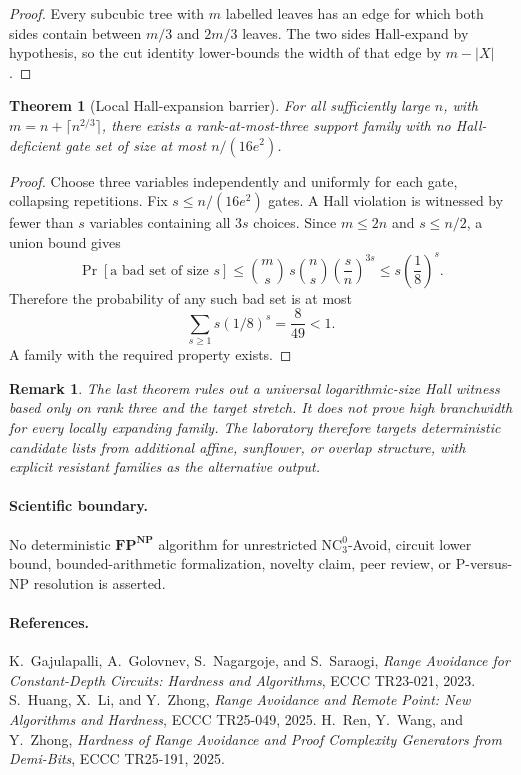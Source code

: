 \documentclass[11pt]{article}
\newtheorem{theorem}{Theorem}
\newtheorem{remark}{Remark}
\begin{document}
\begin{proof}
Every subcubic tree with $m$ labelled leaves has an edge for which both sides
contain between $m/3$ and $2m/3$ leaves. The two sides Hall-expand by
hypothesis, so the cut identity lower-bounds the width of that edge by
$m-|X|$.
\end{proof}

\begin{theorem}[Local Hall-expansion barrier]
For all sufficiently large $n$, with
$m=n+\lceil n^{2/3}\rceil$, there exists a rank-at-most-three support family
with no Hall-deficient gate set of size at most $n/(16e^2)$.
\end{theorem}

\begin{proof}
Choose three variables independently and uniformly for each gate, collapsing
repetitions. Fix $s\leq n/(16e^2)$ gates. A Hall violation is witnessed by
fewer than $s$ variables containing all $3s$ choices. Since $m\leq2n$ and
$s\leq n/2$, a union bound gives
\[
 \Pr[\text{a bad set of size }s]
 \leq {m\choose s}\,s{n\choose s}\left(\frac{s}{n}\right)^{3s}
 \leq s\left(\frac18\right)^s.
\]
Therefore the probability of any such bad set is at most
\[
 \sum_{s\geq1}s(1/8)^s=\frac8{49}<1.
\]
A family with the required property exists.
\end{proof}

\begin{remark}
The last theorem rules out a universal logarithmic-size Hall witness based only
on rank three and the target stretch. It does not prove high branchwidth for
every locally expanding family. The laboratory therefore targets deterministic
candidate lists from additional affine, sunflower, or overlap structure, with
explicit resistant families as the alternative output.
\end{remark}

\paragraph{Scientific boundary.}
No deterministic $\mathbf{FP}^{\mathbf{NP}}$ algorithm for unrestricted
$\mathrm{NC}^0_3$-Avoid, circuit lower bound, bounded-arithmetic formalization,
novelty claim, peer review, or P-versus-NP resolution is asserted.

\paragraph{References.}
K.~Gajulapalli, A.~Golovnev, S.~Nagargoje, and S.~Saraogi,
\emph{Range Avoidance for Constant-Depth Circuits: Hardness and Algorithms},
ECCC TR23-021, 2023. S.~Huang, X.~Li, and Y.~Zhong,
\emph{Range Avoidance and Remote Point: New Algorithms and Hardness},
ECCC TR25-049, 2025. H.~Ren, Y.~Wang, and Y.~Zhong,
\emph{Hardness of Range Avoidance and Proof Complexity Generators from
Demi-Bits}, ECCC TR25-191, 2025.
\end{document}
